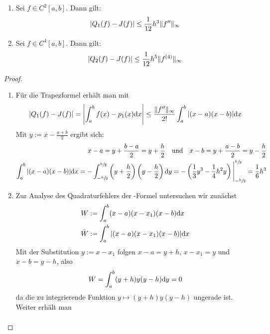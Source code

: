 \begin{proposition}
	\begin{enumerate}[label=(\alph*)]
		\item Sei $f\in C^2[a,b]$. Dann gilt:
		\begin{align}
			\vert Q_1(f)-J(f)\vert \le \frac{1}{12}h^3\Vert f''\Vert_\infty\notag
		\end{align}
		\item Sei $f\in C^4[a,b]$. Dann gilt:
		\begin{align}
			\vert Q_2(f)-J(f)\vert \le \frac{1}{12}h^5\Vert f^{(4)}\Vert_\infty\notag
		\end{align}
	\end{enumerate}
\end{proposition}
\begin{proof}
	\begin{enumerate}[label=(\alph*)]
		\item Für die Trapezformel erhält man mit 
		\begin{align}
			\vert Q_1(f)-J(f)\vert = \left|\int_a^b f(x)-p_1(x)\mathrm{d} x\right|\le \frac{\Vert f''\Vert_\infty}{2!}\int_a^b\vert (x-a)(x-b)\vert\mathrm{d} x\notag
		\end{align}
		Mit $y:=x-\frac{a+b}{2}$ ergibt sich:
		\begin{align}
			x-a=y+\frac{b-a}{2}=y+\frac{h}{2}\quad\text{und}\quad x-b=y+\frac{a-b}{2}=y-\frac{h}{2}\notag \\
			\int_a^b\vert (x-a)(x-b)\vert\mathrm{d} x = -\int_{-\sfrac{h}{2}}^{\sfrac{h}{2}}\left(y + \frac{h}{2}\right)\left(y - \frac{h}{2}\right)\mathrm{d} y = -\left(\frac{1}{3}y^3 - \frac{1}{4}h^2y\right)\Bigg|_{-\sfrac{h}{2}}^{\sfrac{h}{2}}=\frac{1}{6}h^3 \notag
		\end{align}
		\item Zur Analyse des Quadraturfehlers der -Formel untersuchen wir zunächst
		\begin{align}
			W&:=\int_a^b (x-a)(x-x_1)(x-b)\diff x \notag \\
			\overline{W} &:=\int_a^b\vert (x-a)(x-x_1)(x-b)\vert\diff x\notag
		\end{align}
		Mit der Substitution $y:=x-x_1$ folgen $x-a=y+h$, $x-x_1=y$ und $x-b=y-h$, also
		\begin{align}
			\label{2.2}
			W=\int_a^b (y+h)y(y-h)\mathrm{d} y=0
		\end{align}
		da die zu integrierende Funktion $y\mapsto (y+h)y(y-h)$ ungerade ist. Weiter erhält man
		\begin{align}

\end{align}
\end{enumerate}
\end{proof}
